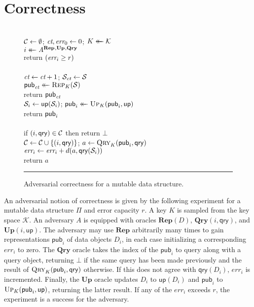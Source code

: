 \section{Correctness}

\begin{figure}[t]
  {
    \\[2pt]
      $\mathcal{C} \gets \emptyset$; $\textit{ct},\textit{err}_0 \gets 0$;
      $K \mathrel{\leftarrow\mkern-14mu\leftarrow} \mathcal{K}$\\
      $i \mathrel{\leftarrow\mkern-14mu\leftarrow} \mathit{A}^{\mathbf{Rep}\hspace{0.5pt},\mathbf{Up}\hspace{0.5pt},\mathbf{Qry}\hspace{0.5pt}}$\\
      return $(\textit{err}_i \geq r)$ 
    \\[6pt]
    \oraclev{$\REPO(\col)$}\\[2pt]
      $\textit{ct}\gets\textit{ct}+1$;
      $\mathcal{S}_{\textit{ct}} \gets \mathcal{S}$\\
      $\mathsf{pub}_{\textit{ct}} \mathrel{\leftarrow\mkern-14mu\leftarrow} \textsc{Rep}_K(\mathcal{S})$\\
      return $\mathsf{pub}_{\textit{ct}}$
  }
  {
    \\[2pt]
      $\mathcal{S}_i \gets \mathsf{up}(\mathcal{S}_i)$;
      $\mathsf{pub}_i \mathrel{\leftarrow\mkern-14mu\leftarrow} \textsc{Up}_K(\mathsf{pub}_i, \mathsf{up})$\\
      return $\mathsf{pub}_i$
    \\[9pt]
    \\[2pt]
      if $(i,\mathsf{qry}) \in \mathcal{C}$ then return $\bot$\\
      $\mathcal{C} \gets \mathcal{C} \cup \{(i,\mathsf{qry})\}$; $a \gets \textsc{Qry}_K(\mathsf{pub}_i, \mathsf{qry})$\\
      $\textit{err}_i \gets \textit{err}_i + d(a,\mathsf{qry}(\mathcal{S}_i))$\\
      return $a$
  }
  \caption{Adversarial correctness for a mutable data structure.}
  \vspace{6pt}\hrule
  \label{fig:security}
\end{figure}

An adversarial notion of correctness is given by the following experiment for a mutable data structure $\Pi$ and error capacity $r$. A key $K$ is sampled from the key space $\mathcal{K}$. An adversary $A$ is equipped with oracles $\mathbf{Rep}(D)$, $\mathbf{Qry}(i,\mathsf{qry})$, and $\mathbf{Up}(i,\mathsf{up})$. The adversary may use $\mathbf{Rep}$ arbitrarily many times to gain representations $\mathsf{pub}_i$ of data objects $D_i$, in each case initializing a corresponding $err_i$ to zero. The $\mathbf{Qry}$ oracle takes the index of the $\mathsf{pub}_i$ to query along with a query object, returning $\bot$ if the same query has been made previously and the result of $\textsc{Qry}_K(\mathsf{pub}_i,\mathsf{qry})$ otherwise. If this does not agree with $\mathsf{qry}(D_i)$, $err_i$ is incremented. Finally, the $\mathbf{Up}$ oracle updates $D_i$ to $\mathsf{up}(D_i)$ and $\mathsf{pub}_i$ to $\textsc{Up}_K(\mathsf{pub}_i,\mathsf{up})$, returning the latter result. If any of the $err_i$ exceeds $r$, the experiment is a success for the adversary.

